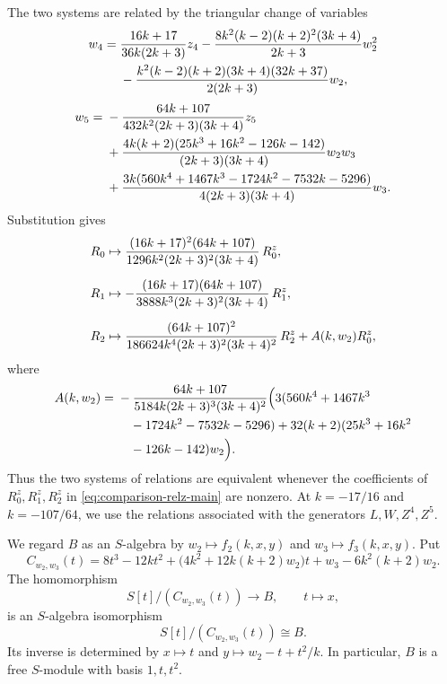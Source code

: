 \documentclass[11 pt]{amsart}
\theoremstyle{definition}
\theoremstyle{plain}
\begin{document}
The two systems are related by the triangular change of variables
\begin{align}
w_4={}&
\frac{16k+17}{36k(2k+3)}z_4
-\frac{8k^2(k-2)(k+2)^2(3k+4)}{2k+3}w_2^2 \notag\\
&-\frac{k^2(k-2)(k+2)(3k+4)(32k+37)}{2(2k+3)}w_2,
\label{eq:w4-z4-main}
\end{align}
\begin{align}
 w_5={}&
 -\frac{64k+107}{432k^2(2k+3)(3k+4)}z_5 \notag\\
&+\frac{4k(k+2)(25k^3+16k^2-126k-142)}
{(2k+3)(3k+4)}w_2w_3 \notag\\
&+\frac{3k(560k^4+1467k^3-1724k^2-7532k-5296)}
  {4(2k+3)(3k+4)}w_3 .
\label{eq:w5-z5-main}
\end{align}
Substitution gives
\begin{align}
R_0 &\mapsto
\frac{(16k+17)^2(64k+107)}
  {1296k^2(2k+3)^2(3k+4)}\,R_0^z,\notag\\[2mm]
R_1 &\mapsto
-\frac{(16k+17)(64k+107)}
  {3888k^3(2k+3)^2(3k+4)}\,R_1^z,\notag\\[2mm]
R_2 &\mapsto
\frac{(64k+107)^2}
  {186624k^4(2k+3)^2(3k+4)^2}\,R_2^z
  +A(k,w_2)R_0^z,
\label{eq:comparison-relz-main}
\end{align}
where
\begin{equation}\label{eq:A-correction-main}
\begin{aligned}
A(k,w_2)={}&-
\frac{64k+107}{5184k(2k+3)^3(3k+4)^2}
\Bigl(3(560k^4+1467k^3 \\
&\quad -1724k^2-7532k-5296)
+32(k+2)(25k^3+16k^2 \\
&\quad -126k-142)w_2\Bigr).
\end{aligned}
\end{equation}
Thus the two systems of relations are equivalent whenever the
coefficients of $R_0^z,R_1^z,R_2^z$ in
\eqref{eq:comparison-relz-main} are nonzero. At $k=-17/16$ and
$k=-107/64$, we use the relations associated with the generators
$L,W,Z^4,Z^5$.



We regard $B$ as an $S$-algebra by
$w_2\mapsto f_2(k,x,y)$ and $w_3\mapsto f_3(k,x,y)$.  Put
\begin{equation}\label{eq:cubic-main}
C_{w_2,w_3}(t)=8t^3-12kt^2+
\bigl(4k^2+12k(k+2)w_2\bigr)t
+w_3-6k^2(k+2)w_2.
\end{equation}
The homomorphism
\[
S[t]/(C_{w_2,w_3}(t))\longrightarrow B,\qquad t\longmapsto x,
\]
is an $S$-algebra isomorphism
\begin{equation}\label{eq:cubic-ring-isomorphism}
  S[t]/(C_{w_2,w_3}(t))\cong B.
\end{equation}
Its inverse is determined by
$x\mapsto t$ and $y\mapsto w_2-t+t^2/k$.
In particular, $B$ is a free $S$-module with basis $1,t,t^2$.
\end{document}
